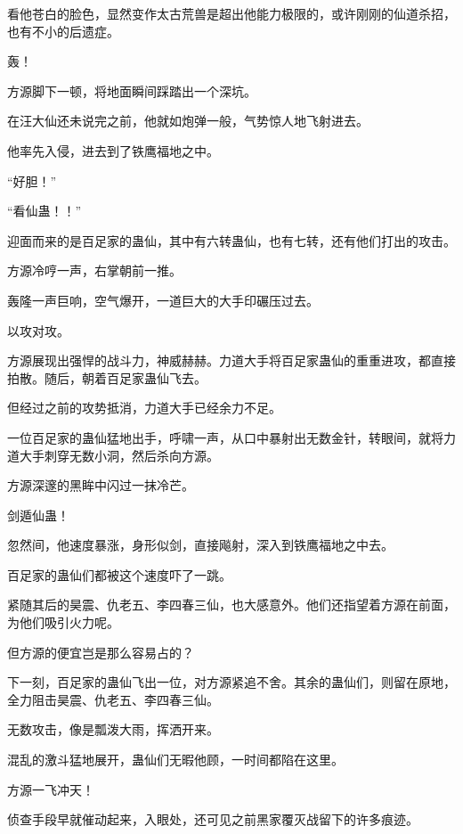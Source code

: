 \begin{this_body}
看他苍白的脸色，显然变作太古荒兽是超出他能力极限的，或许刚刚的仙道杀招，也有不小的后遗症。

轰！

方源脚下一顿，将地面瞬间踩踏出一个深坑。

在汪大仙还未说完之前，他就如炮弹一般，气势惊人地飞射进去。

他率先入侵，进去到了铁鹰福地之中。

“好胆！”

“看仙蛊！！”

迎面而来的是百足家的蛊仙，其中有六转蛊仙，也有七转，还有他们打出的攻击。

方源冷哼一声，右掌朝前一推。

轰隆一声巨响，空气爆开，一道巨大的大手印碾压过去。

以攻对攻。

方源展现出强悍的战斗力，神威赫赫。力道大手将百足家蛊仙的重重进攻，都直接拍散。随后，朝着百足家蛊仙飞去。

但经过之前的攻势抵消，力道大手已经余力不足。

一位百足家的蛊仙猛地出手，呼啸一声，从口中暴射出无数金针，转眼间，就将力道大手刺穿无数小洞，然后杀向方源。

方源深邃的黑眸中闪过一抹冷芒。

剑遁仙蛊！

忽然间，他速度暴涨，身形似剑，直接飚射，深入到铁鹰福地之中去。

百足家的蛊仙们都被这个速度吓了一跳。

紧随其后的昊震、仇老五、李四春三仙，也大感意外。他们还指望着方源在前面，为他们吸引火力呢。

但方源的便宜岂是那么容易占的？

下一刻，百足家的蛊仙飞出一位，对方源紧追不舍。其余的蛊仙们，则留在原地，全力阻击昊震、仇老五、李四春三仙。

无数攻击，像是瓢泼大雨，挥洒开来。

混乱的激斗猛地展开，蛊仙们无暇他顾，一时间都陷在这里。

方源一飞冲天！

侦查手段早就催动起来，入眼处，还可见之前黑家覆灭战留下的许多痕迹。

\end{this_body}


